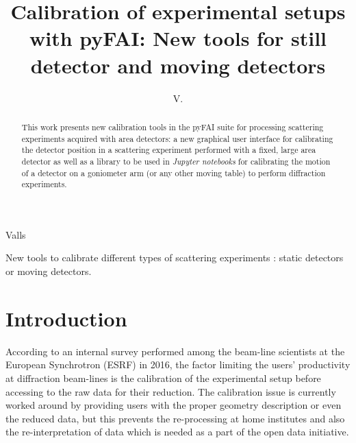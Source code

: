 \documentclass[preprint, pdf]{iucr}              %
\begin{document}

\title{Calibration of experimental setups with {pyFAI}: New tools for still
detector and moving detectors}

 \author[a]{V.}{Valls}
 
 





\maketitle                        %

\begin{synopsis}
New tools to calibrate different types of scattering experiments : static
detectors or moving detectors.
\end{synopsis}

\begin{abstract}


This work presents new calibration tools in the pyFAI
suite for processing scattering experiments acquired with area detectors:
a new graphical user interface for calibrating the detector position in a  
scattering experiment performed with a fixed, large area detector as well as 
a library to be used in \textit{Jupyter notebooks} for calibrating the motion
of a detector on a goniometer arm (or any other moving table) to perform
diffraction experiments.
\end{abstract}


\section{Introduction}

According to an internal survey performed among the beam-line scientists at
the European Synchrotron (ESRF) in 2016, the factor limiting the users'
productivity at diffraction beam-lines is the calibration of the experimental
setup before accessing to the raw data for their reduction. 
The calibration issue is currently worked around by providing users with the
proper geometry description or even the reduced data, but this prevents the
re-processing at home institutes and also the re-interpretation of data which
is needed as a part of the open data initiative.
\end{document}

